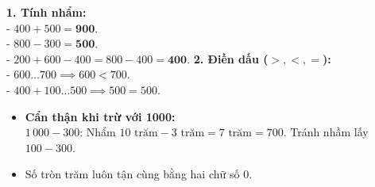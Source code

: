 \documentclass[11pt,a4paper]{article}
\begin{document}
\vspace{-1.5mm}
\noindent
\begin{minipage}[t]{0.49\textwidth}\vspace{0pt}
\begin{tcolorbox}[
  enhanced,
  colback=green!4!white,
  colframe=green!60!black,
  arc=2mm, boxrule=0.8pt,
  left=2mm, right=2mm, top=1.8mm, bottom=1.8mm,
  title={\footnotesize\bfseries\color{white}\faCheckCircle\ 4. Ví dụ thực hành chuẩn mực}
]
{\footnotesize
\textbf{1. Tính nhẩm:}\\
- $400 + 500 = \mathbf{900}$.\\
- $800 - 300 = \mathbf{500}$.\\
- $200 + 600 - 400 = 800 - 400 = \mathbf{400}$.
\textbf{2. Điền dấu ($>, <, =$):}\\
- $600 \dots 700 \implies 600 < 700$.\\
- $400 + 100 \dots 500 \implies 500 = 500$.
}
\end{tcolorbox}
\end{minipage}
\hfill
\begin{minipage}[t]{0.49\textwidth}\vspace{0pt}
\begin{tcolorbox}[
  enhanced,
  colback=red!4!white,
  colframe=red!75!black,
  arc=2mm, boxrule=0.8pt,
  left=2mm, right=2mm, top=1.8mm, bottom=1.8mm,
  title={\footnotesize\bfseries\color{white}\faExclamationTriangle\ 5. Mẹo tránh bẫy trắc nghiệm}
]
{\footnotesize
\begin{itemize}\setlength{\itemsep}{1pt}\setlength{\leftskip}{-2.5mm}
  \item \textbf{Cẩn thận khi trừ với 1000:}\\
  $1\,000 - 300$: Nhẩm $10\text{ trăm} - 3\text{ trăm} = 7\text{ trăm} = 700$. Tránh nhầm lấy $100 - 300$.
  \item Số tròn trăm luôn tận cùng bằng hai chữ số 0.
\end{itemize}
}
\end{tcolorbox}
\end{minipage}
\end{document}
